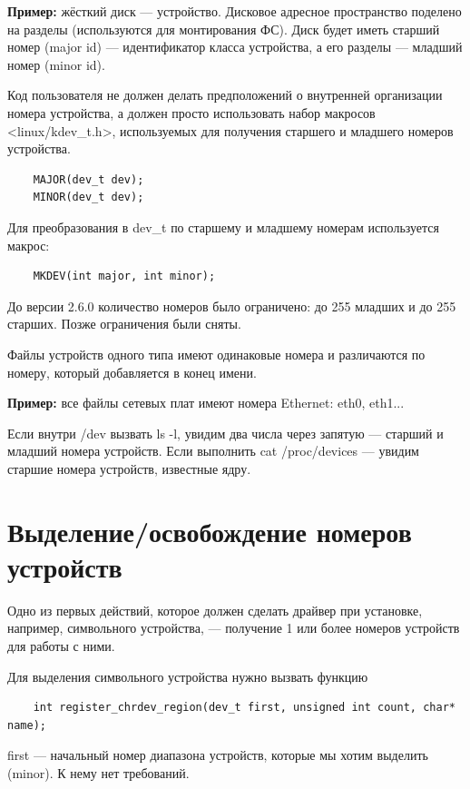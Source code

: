 \textbf{Пример:} жёсткий диск --- устройство. Дисковое адресное пространство поделено на разделы (используются для монтирования ФС). Диск будет иметь старший номер (major id) --- идентификатор класса устройства, а его разделы --- младший номер (minor id).  

Код пользователя не должен делать предположений о внутренней организации номера устройства, а должен просто использовать набор макросов <linux/kdev\_t.h>, используемых для получения старшего и младшего номеров устройства.

\begin{lstlisting}
	MAJOR(dev_t dev);
	MINOR(dev_t dev);
\end{lstlisting}

Для преобразования в dev\_t по старшему и младшему номерам используется макрос:

\begin{lstlisting}
	MKDEV(int major, int minor);
\end{lstlisting}

До версии 2.6.0 количество номеров было ограничено: до 255 младших и до 255 старших. Позже ограничения были сняты.

Файлы устройств одного типа имеют одинаковые номера и различаются по номеру, который добавляется в конец имени. 

\textbf{Пример:} все файлы сетевых плат имеют номера Ethernet: eth0, eth1...

Если внутри /dev вызвать ls -l, увидим два числа через запятую --- старший и младший номера устройств. Если выполнить cat /proc/devices --- увидим старшие номера устройств, известные ядру.

\section{Выделение/освобождение номеров устройств}

Одно из первых действий, которое должен сделать драйвер при установке, например, символьного устройства, --- получение 1 или более номеров устройств для работы с ними. 

Для выделения символьного устройства нужно вызвать функцию

\begin{lstlisting}
	int register_chrdev_region(dev_t first, unsigned int count, char* name);
\end{lstlisting}

first --- начальный номер диапазона устройств, которые мы хотим выделить (minor). К нему нет требований.


